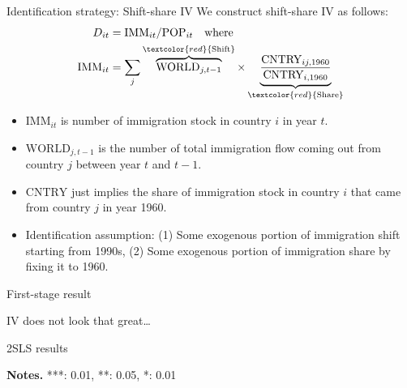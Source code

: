 \documentclass[notes,11pt, aspectratio=169]{beamer}
\begin{document}
\begin{frame}{Identification strategy: Shift-share IV}
	We construct shift-share IV as follows:
	\begin{align*}
		D_{it} &= \text{IMM}_{it} / \text{POP}_{it} \quad \text{where}\\ \nonumber  
		\text{IMM}_{it}  &= \sum_j \overbrace{\text{WORLD}_{j,t-1}}^{\textcolor{red}{\text{Shift}}} \times \underbrace{\frac{\text{CNTRY}_{ij, 1960}}{\text{CNTRY}_{i,1960}}}_{\textcolor{red}{\text{Share}}}	
	\end{align*}

	\begin{itemize}
		\item $\text{IMM}_{it}$ is number of immigration stock in country $i$ in year $t$.
		\item $\text{WORLD}_{j,t-1}$ is the number of total immigration flow  coming out from country $j$ between year $t$ and $t-1$.
		\item $\text{CNTRY}$ just implies the share of immigration stock in country $i$ that came from country $j$ in year 1960.
		\item Identification assumption: (1) Some exogenous portion of immigration shift starting from 1990s, (2) Some exogenous portion of immigration share by fixing it to 1960.
	\end{itemize}
\end{frame}

\begin{frame}{First-stage result}
	\begin{figure}
	\end{figure}	
	IV does not look that great\ldots
\end{frame}

\begin{frame}{2SLS results}
\begin{table}
	\resizebox{0.8\textwidth}{!}{
	}
\end{table}	
\begin{footnotesize}
	\textbf{Notes.} ***: 0.01, **: 0.05, *: 0.01
\end{footnotesize}
\end{frame}
\end{document}
